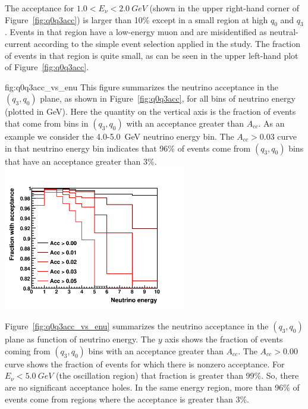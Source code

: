 The acceptance for $\num{1.0} < E_\nu < \SI{2.0}{GeV}$ (shown in the upper right-hand corner of Figure~\ref{fig:q0q3acc}) is larger than 10\% except in a small region at high $q_0$ and $q_3$. Events in that region have a low-energy muon and are misidentified as neutral-current according to the simple event selection applied in the study. The fraction of events in that region is quite small, as can be seen in the upper left-hand plot of Figure~\ref{fig:q0q3acc}. 

\begin{dunefigure}{fig:q0q3acc_vs_enu}
{This figure summarizes the neutrino acceptance in the $(q_3,q_0)$ plane, as shown in Figure~\ref{fig:q0q3acc}, for all bins of neutrino energy (plotted in GeV). Here the quantity on the vertical axis is the fraction of events that come from bins in $(q_3,q_0)$ with an acceptance greater than $A_{cc}$. As an example we consider the \num{4.0}-\SI{5.0}{GeV} neutrino energy bin. The $A_{cc}>0.03$ curve in that neutrino energy bin indicates that 96\% of events come from $(q_3,q_0)$ bins that have an acceptance greater than 3\%. }
      \includegraphics[width=0.6\textwidth]{graphics/frac_with_acc.png}
\end{dunefigure}

Figure~\ref{fig:q0q3acc_vs_enu} summarizes the neutrino acceptance in the $(q_3,q_0)$ plane as function of neutrino energy. The $y$ axis shows the fraction of events coming from $(q_3,q_0)$ bins with an acceptance greater than $A_{cc}$. The $A_{cc}>0.00$ curve shows the fraction of events for which there is nonzero acceptance. For $E_\nu < \SI{5.0}{GeV}$ (the oscillation region) that fraction is greater than 99\%. So, there are no significant acceptance holes.  In the same energy region, more than 96\% of events come from regions where the acceptance is greater than 3\%. %

